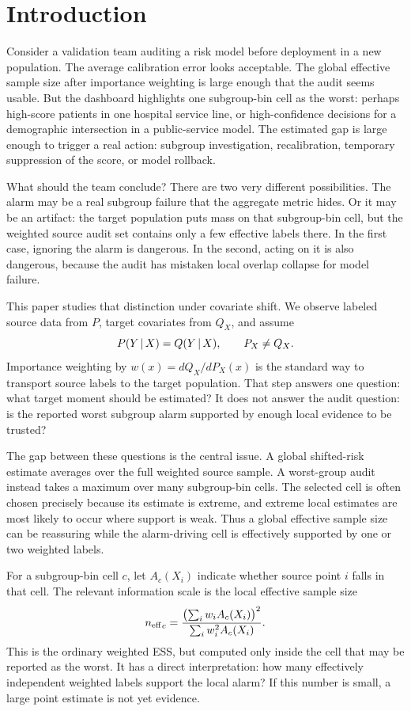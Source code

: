 \section{Introduction}

Consider a validation team auditing a risk model before deployment in a new population. The average calibration error looks acceptable. The global effective sample size after importance weighting is large enough that the audit seems usable. But the dashboard highlights one subgroup-bin cell as the worst: perhaps high-score patients in one hospital service line, or high-confidence decisions for a demographic intersection in a public-service model. The estimated gap is large enough to trigger a real action: subgroup investigation, recalibration, temporary suppression of the score, or model rollback.

What should the team conclude? There are two very different possibilities. The alarm may be a real subgroup failure that the aggregate metric hides. Or it may be an artifact: the target population puts mass on that subgroup-bin cell, but the weighted source audit set contains only a few effective labels there. In the first case, ignoring the alarm is dangerous. In the second, acting on it is also dangerous, because the audit has mistaken local overlap collapse for model failure.

This paper studies that distinction under covariate shift. We observe labeled source data from \(P\), target covariates from \(Q_X\), and assume
\[
P(Y\,|\, X)=Q(Y\,|\, X),
\qquad
P_X\neq Q_X .
\]
Importance weighting by \(w(x)=dQ_X/dP_X(x)\) is the standard way to transport source labels to the target population. That step answers one question: what target moment should be estimated? It does not answer the audit question: is the reported worst subgroup alarm supported by enough local evidence to be trusted?

The gap between these questions is the central issue. A global shifted-risk estimate averages over the full weighted source sample. A worst-group audit instead takes a maximum over many subgroup-bin cells. The selected cell is often chosen precisely because its estimate is extreme, and extreme local estimates are most likely to occur where support is weak. Thus a global effective sample size can be reassuring while the alarm-driving cell is effectively supported by one or two weighted labels.

For a subgroup-bin cell \(c\), let \(A_c(X_i)\) indicate whether source point \(i\) falls in that cell. The relevant information scale is the local effective sample size
\[
{n_{\mathrm{eff}}}_c
=
\frac{\bigl(\sum_i w_iA_c(X_i)\bigr)^2}
{\sum_i w_i^2A_c(X_i)}.
\]
This is the ordinary weighted ESS, but computed only inside the cell that may be reported as the worst. It has a direct interpretation: how many effectively independent weighted labels support the local alarm? If this number is small, a large point estimate is not yet evidence.

